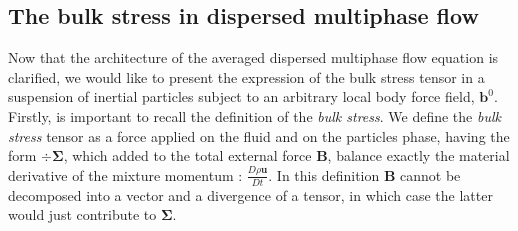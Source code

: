 

\subsection{The bulk stress in dispersed multiphase flow}

Now that the architecture of the averaged dispersed multiphase flow equation is clarified, we would like to present the expression of the bulk stress tensor in a suspension of inertial particles subject to an arbitrary local body force field, $\textbf{b}^0$.
Firstly, is important to recall the definition of the \textit{bulk stress}. 
We define the \textit{bulk stress} tensor as a force applied on the fluid and on the particles phase, having the form $\div \bm{\Sigma}$, which added to the total external force $\textbf{B}$, balance exactly the material derivative of the mixture momentum : $\frac{D \rho \textbf{u}}{Dt}$. 
In this definition $\textbf{B}$ cannot be decomposed into a vector and a divergence of a tensor, in which case the latter would just contribute to $\bm{\Sigma}$.

